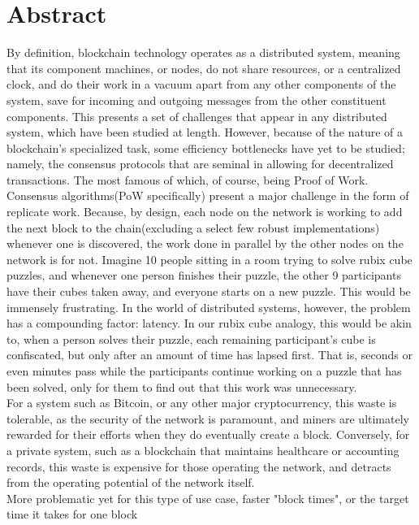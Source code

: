 \documentclass[11pt]{article}
\begin{document}
    \section{Abstract}
    By definition, blockchain technology operates as a distributed system, meaning that its component machines, or nodes,
    do not share resources, or a centralized clock, and do their work in a vacuum apart from any other components of the
    system, save for incoming and outgoing messages from the other constituent components.
    This presents a set of challenges that appear in any distributed system, which have been studied at length.
    However, because of the nature of a blockchain's specialized task, some efficiency bottlenecks have yet to be studied;
    namely, the consensus protocols that are seminal in allowing for decentralized transactions.
    The most famous of which, of course, being Proof of Work.\\
    Consensus algorithms(PoW specifically) present a major challenge in the form of replicate work.
    Because, by design, each node on the network is working to add the next block to the chain(excluding a select few
    robust implementations) whenever one is discovered, the work done in parallel by the other nodes on the network is
    for not.
    Imagine 10 people sitting in a room trying to solve rubix cube puzzles, and whenever one person finishes their
    puzzle, the other 9 participants have their cubes taken away, and everyone starts on a new puzzle.
    This would be immensely frustrating.
    In the world of distributed systems, however, the problem has a compounding factor: latency.
    In our rubix cube analogy, this would be akin to, when a person solves their puzzle, each remaining participant's
    cube is confiscated, but only after an amount of time has lapsed first.
    That is, seconds or even minutes pass while the participants continue working on a puzzle that has been solved,
    only for them to find out that this work was unnecessary.\\
    For a system such as Bitcoin, or any other major cryptocurrency, this waste is tolerable, as the security of the
    network is paramount, and miners are ultimately rewarded for their efforts when they do eventually create a block.
    Conversely, for a private system, such as a blockchain that maintains healthcare or accounting records, this waste
    is expensive for those operating the network, and detracts from the operating potential of the network itself.\\
    More problematic yet for this type of use case, faster "block times", or the target time it takes for one block
\end{document}

